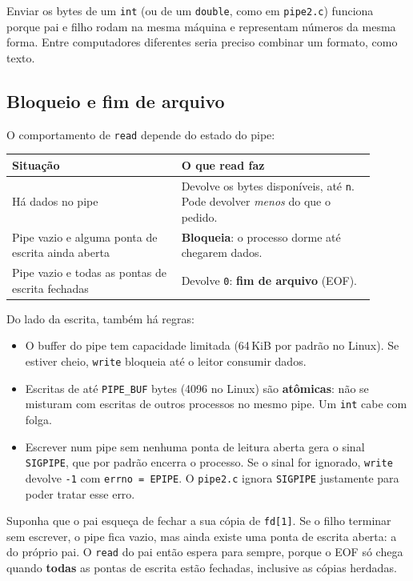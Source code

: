 \documentclass[11pt,a4paper]{article}
\newcommand{\cmd}[1]{\texttt{#1}}
\begin{document}
Enviar os bytes de um \cmd{int} (ou de um \cmd{double}, como em \cmd{pipe2.c}) funciona porque pai e filho rodam na mesma máquina e representam números da mesma forma. Entre computadores diferentes seria preciso combinar um formato, como texto.

\subsection{Bloqueio e fim de arquivo}

O comportamento de \cmd{read} depende do estado do pipe:

\begin{center}
\begin{tabular}{@{}p{0.42\linewidth}p{0.48\linewidth}@{}}
\toprule
\textbf{Situação} & \textbf{O que read faz} \\
\midrule
Há dados no pipe & Devolve os bytes disponíveis, até \cmd{n}. Pode devolver \emph{menos} do que o pedido. \\
Pipe vazio e alguma ponta de escrita ainda aberta & \textbf{Bloqueia}: o processo dorme até chegarem dados. \\
Pipe vazio e todas as pontas de escrita fechadas & Devolve \cmd{0}: \textbf{fim de arquivo} (EOF). \\
\bottomrule
\end{tabular}
\end{center}

Do lado da escrita, também há regras:

\begin{itemize}
    \item O buffer do pipe tem capacidade limitada (64\,KiB por padrão no Linux). Se estiver cheio, \cmd{write} bloqueia até o leitor consumir dados.
    \item Escritas de até \cmd{PIPE\_BUF} bytes (4096 no Linux) são \textbf{atômicas}: não se misturam com escritas de outros processos no mesmo pipe. Um \cmd{int} cabe com folga.
    \item Escrever num pipe sem nenhuma ponta de leitura aberta gera o sinal \cmd{SIGPIPE}, que por padrão encerra o processo. Se o sinal for ignorado, \cmd{write} devolve \cmd{-1} com \cmd{errno = EPIPE}. O \cmd{pipe2.c} ignora \cmd{SIGPIPE} justamente para poder tratar esse erro.
\end{itemize}

\begin{pergunta}
Suponha que o pai esqueça de fechar a sua cópia de \cmd{fd[1]}. Se o filho terminar sem escrever, o pipe fica vazio, mas ainda existe uma ponta de escrita aberta: a do próprio pai. O \cmd{read} do pai então espera para sempre, porque o EOF só chega quando \textbf{todas} as pontas de escrita estão fechadas, inclusive as cópias herdadas.
\end{pergunta}
\end{document}
